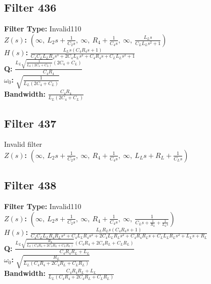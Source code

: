 \documentclass{article}
\begin{document}
\subsection*{Filter 436}
\textbf{Filter Type:} Invalid110 \\ 
\textbf{$Z(s)$:} $\left( \infty, \  L_{2} s + \frac{1}{C_{2} s}, \  \infty, \  R_{4} + \frac{1}{C_{4} s}, \  \infty, \  \frac{L_{L} s}{C_{L} L_{L} s^{2} + 1}\right)$ \\ 
\textbf{$H(s)$:} $\frac{L_{L} s \left(C_{4} R_{4} s + 1\right)}{C_{4} C_{L} L_{L} R_{4} s^{3} + 2 C_{4} L_{L} s^{2} + C_{4} R_{4} s + C_{L} L_{L} s^{2} + 1}$ \\ 
\textbf{Q:} $\frac{L_{L} \sqrt{\frac{1}{L_{L} \left(2 C_{4} + C_{L}\right)}} \left(2 C_{4} + C_{L}\right)}{C_{4} R_{4}}$ \\ 
\textbf{$\omega_0$:} $\sqrt{\frac{1}{L_{L} \left(2 C_{4} + C_{L}\right)}}$ \\ 
\textbf{Bandwidth:} $\frac{C_{4} R_{4}}{L_{L} \left(2 C_{4} + C_{L}\right)}$ \\ 
\subsection*{Filter 437}
Invalid filter \\ 
\textbf{$Z(s)$:} $\left( \infty, \  L_{2} s + \frac{1}{C_{2} s}, \  \infty, \  R_{4} + \frac{1}{C_{4} s}, \  \infty, \  L_{L} s + R_{L} + \frac{1}{C_{L} s}\right)$ \\ 
\subsection*{Filter 438}
\textbf{Filter Type:} Invalid110 \\ 
\textbf{$Z(s)$:} $\left( \infty, \  L_{2} s + \frac{1}{C_{2} s}, \  \infty, \  R_{4} + \frac{1}{C_{4} s}, \  \infty, \  \frac{1}{C_{L} s + \frac{1}{R_{L}} + \frac{1}{L_{L} s}}\right)$ \\ 
\textbf{$H(s)$:} $\frac{L_{L} R_{L} s \left(C_{4} R_{4} s + 1\right)}{C_{4} C_{L} L_{L} R_{4} R_{L} s^{3} + C_{4} L_{L} R_{4} s^{2} + 2 C_{4} L_{L} R_{L} s^{2} + C_{4} R_{4} R_{L} s + C_{L} L_{L} R_{L} s^{2} + L_{L} s + R_{L}}$ \\ 
\textbf{Q:} $\frac{L_{L} \sqrt{\frac{R_{L}}{L_{L} \left(C_{4} R_{4} + 2 C_{4} R_{L} + C_{L} R_{L}\right)}} \left(C_{4} R_{4} + 2 C_{4} R_{L} + C_{L} R_{L}\right)}{C_{4} R_{4} R_{L} + L_{L}}$ \\ 
\textbf{$\omega_0$:} $\sqrt{\frac{R_{L}}{L_{L} \left(C_{4} R_{4} + 2 C_{4} R_{L} + C_{L} R_{L}\right)}}$ \\ 
\textbf{Bandwidth:} $\frac{C_{4} R_{4} R_{L} + L_{L}}{L_{L} \left(C_{4} R_{4} + 2 C_{4} R_{L} + C_{L} R_{L}\right)}$ \\ 
\end{document}
